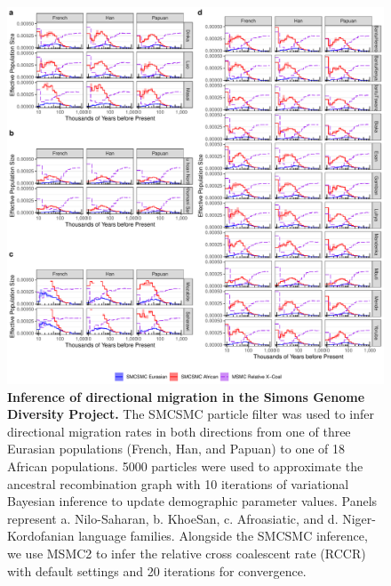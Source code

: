 \begin{figure}
	\centering
	\includegraphics[width=0.95\linewidth]{plot/sgdp_mig_new.pdf}
	\caption[Migration inference in the Simons Genome Diversity Project from SMCSMC and MSMC2]{{\bf Inference of directional migration in the Simons Genome Diversity Project.} The SMCSMC particle filter was used to infer directional migration rates in both directions from one of three Eurasian populations (French, Han, and Papuan) to one of 18 African populations. 5000 particles were used to approximate the ancestral recombination graph with 10 iterations of variational Bayesian inference to update demographic parameter values. Panels represent a. Nilo-Saharan, b. KhoeSan, c. Afroasiatic, and d. Niger-Kordofanian language families. Alongside the SMCSMC inference, we use MSMC2 to infer the relative cross coalescent rate (RCCR) with default settings and 20 iterations for convergence.}	
	\label{fig:sgdp_mig}
\end{figure}


